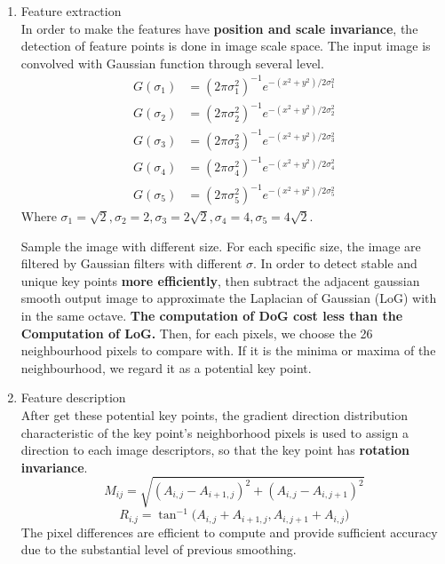\documentclass[11pt]{article}
\begin{document}
\begin{enumerate}
\item Feature extraction\\
In order to make the features have {\bf position and scale invariance}, the detection of feature points is done in image scale space. The input image is convolved with Gaussian function through several level. 
\begin{equation}
\begin{aligned}
G(\sigma _{ 1 })&=(2\pi \sigma ^{ 2 }_{ 1 })^{ -1 }e^{ -(x^{ 2 }+y^{ 2 })/2\sigma ^{ 2 }_{ 1 } }\\
G(\sigma _{ 2 })&=(2\pi \sigma ^{ 2 }_{ 2 })^{ -1 }e^{ -(x^{ 2 }+y^{ 2 })/2\sigma ^{ 2 }_{ 2 } }\\
G(\sigma _{ 3 })&=(2\pi \sigma ^{ 2 }_{ 3 })^{ -1 }e^{ -(x^{ 2 }+y^{ 2 })/2\sigma ^{ 2 }_{ 3 } }\\
G(\sigma _{ 4 })&=(2\pi \sigma ^{ 2 }_{ 4 })^{ -1 }e^{ -(x^{ 2 }+y^{ 2 })/2\sigma ^{ 2 }_{ 4 } }\\
G(\sigma _{ 5 })&=(2\pi \sigma ^{ 2 }_{ 5 })^{ -1 }e^{ -(x^{ 2 }+y^{ 2 })/2\sigma ^{ 2 }_{ 5 } }
\end{aligned}
\end{equation}
Where $\sigma_{1}= \sqrt { 2 }, \sigma_{2}= 2 , \sigma_{3}= 2\sqrt { 2 }, \sigma_{4}= 4, \sigma_{5}= 4\sqrt { 2 }$.\par
Sample the image with different size. For each specific size, the image are filtered by Gaussian filters with different $\sigma$.
In order to detect stable and unique key points {\bf more efficiently}, then subtract the adjacent gaussian smooth output image to approximate the Laplacian of Gaussian (LoG) with in the same octave. {\bf The computation of DoG cost less than the Computation of LoG.} Then, for each pixels, we choose the 26 neighbourhood pixels to compare with. If it is the minima or maxima of the neighbourhood, we regard it as a potential key point.\par
\item Feature description\\
After get these potential key points, the gradient direction distribution characteristic of the key point's neighborhood pixels is used to assign a direction to each image descriptors, so that the key point has {\bf rotation invariance}.
\begin{equation}
M_{ ij }=\sqrt { (A_{ i,j }-A_{ i+1,j })^{ 2 }+(A_{ i,j }-A_{ i,j+1 })^{ 2 } } 
\end{equation}
\begin{equation}
R_{ i.j }=\tan ^{ -1 }{ (A_{ i,j }+A_{ i+1,j }, } A_{ i,j+1 }+A_{ i,j })
\end{equation}
The pixel differences are efficient to compute and provide sufficient accuracy due to the substantial level of previous smoothing.


\end{enumerate}
\end{document}
